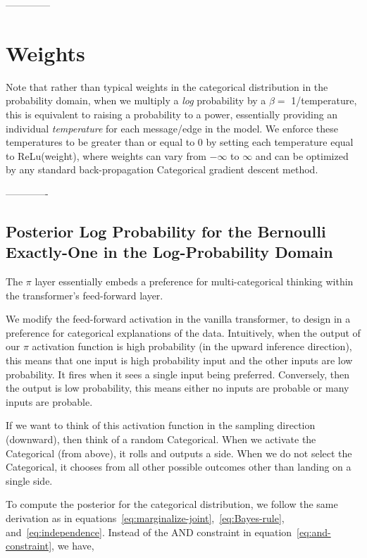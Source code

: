 --------------

\section{Weights}

Note that rather than typical weights in the categorical distribution in the probability domain, when we multiply a \emph{log} probability by a $\beta =$ 1/temperature, this is equivalent to raising a probability to a power, essentially providing an individual \emph{temperature} for each message/edge in the model.  We enforce these temperatures to be greater than or equal to 0 by setting each temperature equal to ReLu(weight), where weights can vary from $-\infty$ to $\infty$ and can be optimized by any standard back-propagation Categorical gradient descent method.


-------------

\subsection{Posterior Log Probability for the Bernoulli Exactly-One in the Log-Probability Domain}

The $\pi$ layer essentially embeds a preference for multi-categorical thinking within the transformer's feed-forward layer. 

We modify the feed-forward activation in the vanilla transformer, to design in a preference for categorical explanations of the data.  Intuitively, when the output of our $\pi$ activation function 
is high probability (in the upward inference direction), this means that one input is high probability input and the other inputs are low probability.  It fires when it sees a single input being preferred.  Conversely, then the output is low probability, this means either no inputs are probable or many inputs are probable.

If we want to think of this activation function in the sampling direction (downward), then think of a random Categorical.  When we activate the Categorical (from above), it rolls and outputs a side.  When we do not select the Categorical, it chooses from all other possible outcomes other than landing on a single side.

To compute the posterior for the categorical distribution, we follow the same derivation as in equations~\ref{eq:marginalize-joint},~\ref{eq:Bayes-rule}, and~\ref{eq:independence}. 
 Instead of the AND constraint in equation~\ref{eq:and-constraint}, we have,

